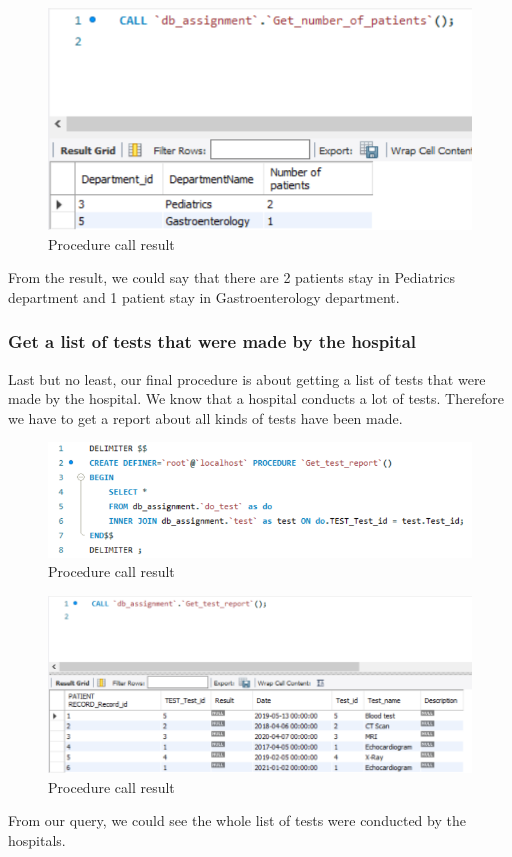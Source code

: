 \begin{figure}[H]
  \centering
  \includegraphics[width = 12cm]{assets/procedure_2b.png}
  \captionsetup{justification=centering,margin=2cm}
  \caption{Procedure call result}
\end{figure}
From the result, we could say that there are 2 patients stay in Pediatrics department and 1 patient stay in Gastroenterology department.

\subsubsection{Get a list of tests that were made by the hospital}
Last but no least, our final procedure is about getting a list of tests that were made by the hospital. We know that a hospital conducts a lot of tests. Therefore we have to get a report about all kinds of tests have been made.

\begin{figure}[H]
  \centering
  \includegraphics[width = 12cm]{assets/procedure_3a.png}
  \captionsetup{justification=centering,margin=2cm}
  \caption{Procedure call result}
\end{figure}

\begin{figure}[H]
  \centering
  \includegraphics[width = 12cm]{assets/procedure_3b.png}
  \captionsetup{justification=centering,margin=2cm}
  \caption{Procedure call result}
\end{figure}

From our query, we could see the whole list of tests were conducted by the hospitals.
